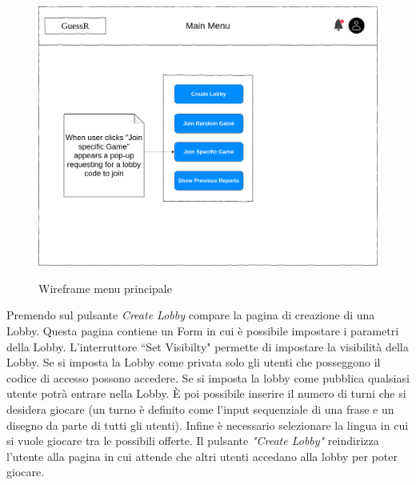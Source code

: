 \begin{figure}[H]
    \caption{Wireframe menu principale}
    \centering
    \includegraphics[width=400mm]{img/wireframes/main_menu.png}
    \label{fig:wireframe_main_menu}
\end{figure}

\noindent Premendo sul pulsante \textit{Create Lobby} compare la pagina di creazione di una Lobby. Questa pagina contiene un Form in cui è possibile impostare i parametri della Lobby. L'interruttore ``Set Visibilty" permette di impostare la visibilità della Lobby. Se si imposta la Lobby come privata solo gli utenti che posseggono il codice di accesso possono accedere. Se si imposta la lobby come pubblica qualsiasi utente potrà entrare nella Lobby.
È poi possibile inserire il numero di turni che si desidera giocare (un turno è definito come l'input sequenziale di una frase e un disegno da parte di tutti gli utenti). Infine è necessario selezionare la lingua in cui si vuole giocare tra le possibili offerte. Il pulsante \textit{"Create Lobby"} reindirizza l'utente alla pagina in cui attende che altri utenti accedano alla lobby per poter giocare.

